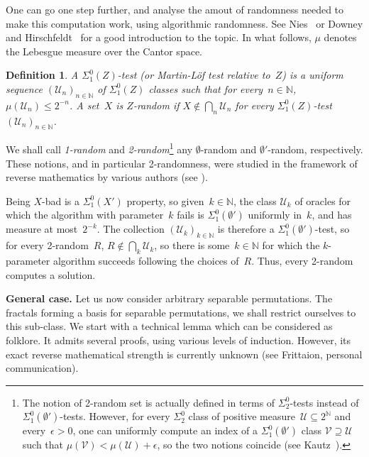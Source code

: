 \documentclass{article}
\numberwithin{theorem}{section}
\newtheorem{definition}[theorem]{Definition}
\def\U{\mathcal{U}}
\def\V{\mathcal{V}}
\newcommand{\cs}{2^{\NN}}
\newcommand{\NN}[0]{\mathbb{N}}
\begin{document}
One can go one step further, and analyse the amout of randomness needed to make this computation work, using algorithmic randomness. See Nies~\cite{nies2009computability} or Downey and Hirschfeldt~\cite{downey2010algorithmic} for a good introduction to the topic. In what follows, $\mu$ denotes the Lebesgue measure over the Cantor space.

\begin{definition}
A \emph{$\Sigma^0_1(Z)$-test} (or Martin-L\"of test relative to~$Z$) is a uniform sequence $(\U_n)_{n \in \NN}$ of $\Sigma^0_1(Z)$ classes such that for every~$n \in \NN$, $\mu(\U_n) \leq 2^{-n}$.
A set~$X$ is \emph{$Z$-random} if $X \not \in \bigcap_n \U_n$ for every $\Sigma^0_1(Z)$-test $(\U_n)_{n \in \NN}$.
\end{definition}

We shall call \emph{1-random} and \emph{2-random}\footnote{The notion of 2-random set is actually defined in terms of $\Sigma^0_2$-tests instead of $\Sigma^0_1(\emptyset')$-tests. However, for every $\Sigma^0_2$ class of positive measure~$\U \subseteq \cs$ and every~$\epsilon > 0$, one can uniformly compute an index of a $\Sigma^0_1(\emptyset')$ class $\V \supseteq \U$ such that $\mu(\V) < \mu(\U) + \epsilon$, so the two notions coincide (see Kautz~\cite{kautz1991degrees}).} any $\emptyset$-random and $\emptyset'$-random, respectively. These notions, and in particular 2-randomness, were studied in the framework of reverse mathematics by various authors (see \cite{conidis2013random,nies2020randomness,belanger2021where}).

Being $X$-bad is a $\Sigma^0_1(X')$ property, so given~$k \in \NN$, the class $\U_k$ of oracles for which the algorithm with parameter~$k$ fails is $\Sigma^0_1(\emptyset')$ uniformly in~$k$, and has measure at most~$2^{-k}$. The collection $(\U_k)_{k \in \NN}$ is therefore a $\Sigma^0_1(\emptyset')$-test, so for every 2-random~$R$, $R \not \in \bigcap_k \U_k$, so there is some~$k \in \NN$ for which the $k$-parameter algorithm succeeds following the choices of~$R$. Thus, every 2-random computes a solution.


\bigskip
\noindent
\textbf{General case.} Let us now consider arbitrary separable permutations. The fractals forming a basis for separable permutations, we shall restrict ourselves to this sub-class.
We start with a technical lemma which can be considered as folklore. It admits several proofs, using various levels of induction. However, its exact reverse mathematical strength is currently unknown (see Frittaion, personal communication).
\end{document}

